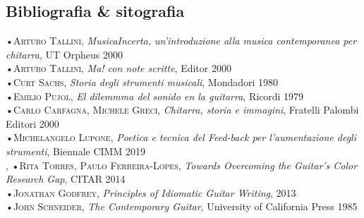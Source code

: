 \documentclass[oneside]{article}
\begin{document}
\begin{multicols*}{2}
\section{ Bibliografia \& sitografia}
•\textsc{\textsf {Arturo Tallini}}, \emph{MusicaIncerta, un'introduzione alla musica contemporanea per chitarra}, UT Orpheus 2000\\
•\textsc{\textsf {Arturo Tallini}}, \emph{Ma! con note scritte}, Editor 2000\\
•\textsc{\textsf {Curt Sachs}}, \emph{Storia degli strumenti musicali}, Mondadori 1980\\
•\textsc{\textsf {Emilio Pujol}}, \emph{El dilemmma del sonido en la guitarra}, Ricordi 1979\\
•\textsc{\textsf {Carlo Carfagna, Michele Greci}}, \emph{Chitarra, storia e immagini}, Fratelli Palombi Editori 2000\\
•\textsc{\textsf {Michelangelo Lupone}}, \emph{Poetica e tecnica del Feed-back per l’aumentazione degli strumenti}, Biennale CIMM 2019\\, 
•\textsc{\textsf {Rita Torres, Paulo Ferreira-Lopes}}, \emph{Towards Overcoming the Guitar's Color Research Gap}, CITAR 2014\\
•\textsc{\textsf {Jonathan Godfrey}}, \emph{Principles of Idiomatic Guitar Writing},  2013\\
•\textsc{\textsf {John Schneider}}, \emph{The Contemporary Guitar},  University of California Press 1985\\

\hspace*{10mm}



\end{multicols*}
\end{document}

